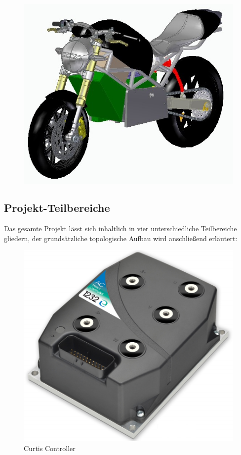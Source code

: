\begin{figure} [H]
	\begin{center}
		\includegraphics[scale=0.8] {figures/mechanik/Ducati2.jpg}
	\end{center}
\end{figure}

\newpage


\subsection{Projekt-Teilbereiche}
Das gesamte Projekt lässt sich inhaltlich in vier unterschiedliche Teilbereiche gliedern, der grundsätzliche topologische Aufbau wird anschließend erläutert:

\begin{figure}[H]
	\begin{center}
		\includegraphics[scale=0.5]{figures/allgemein/Curtis_Controller.png}
		\caption{Curtis Controller}
	\end{center}
\end{figure}

